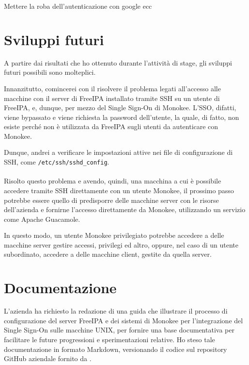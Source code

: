 Mettere la roba dell'autenticazione con google ecc

\section{Sviluppi futuri}
A partire dai risultati che ho ottenuto durante l'attività di stage, gli sviluppi futuri possibili sono molteplici.

Innanzitutto, comincerei con il risolvere il problema legati all'accesso alle macchine con il server di FreeIPA installato tramite SSH su un utente di FreeIPA, e, dunque, per mezzo del Single Sign-On di Monokee. L'SSO, difatti, viene bypassato e viene richiesta la password dell'utente, la quale, di fatto, non esiste perché non è utilizzata da FreeIPA sugli utenti da autenticare con Monokee. 

Dunque, andrei a verificare le impostazioni attive nei file di configurazione di SSH, come \texttt{/etc/ssh/sshd\_config}.
\\ \\
Risolto questo problema e avendo, quindi, una macchina a cui è possibile accedere tramite SSH direttamente con un utente Monokee, il prossimo passo potrebbe essere quello di predisporre delle macchine server con le risorse dell'azienda e fornirne l'accesso 
direttamente da Monokee, utilizzando un servizio come Apache Guacamole.

In questo modo, un utente Monokee privilegiato potrebbe accedere a delle macchine server gestire accessi, privilegi ed altro, oppure, nel caso di un utente subordinato, accedere a delle macchine client, gestite da quella server.
\section{Documentazione}

L'azienda ha richiesto la redazione di una guida che illustrare il processo di configurazione del server FreeIPA e dei sistemi di Monokee per l'integrazione del Single Sign-On sulle macchine UNIX, per fornire una base documentativa per facilitare le future progressioni e sperimentazioni relative. Ho steso tale documentazione in formato Markdown, versionando il codice sul repository GitHub aziendale fornito da \myAzienda.